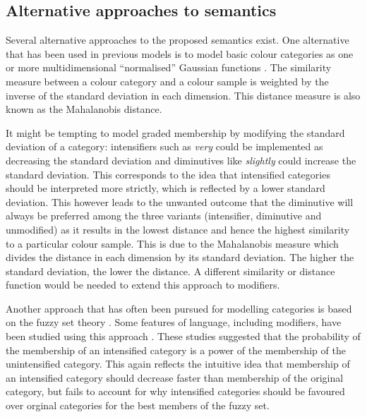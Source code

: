 
\subsection{Alternative approaches to semantics}

Several alternative approaches to the proposed semantics exist. One
alternative that has been used in previous models is to model basic
colour categories as one or more multidimensional ``normalised''
Gaussian functions \citep{lammens94computational,
  steels05coordinating}. The similarity measure between a colour
category and a colour sample is weighted by the inverse of the
standard deviation in each dimension. This distance measure is also
known as the Mahalanobis distance.

It might be tempting to model graded membership by modifying the
standard deviation of a category: intensifiers such as \textit{very} could
be implemented as decreasing the standard deviation and diminutives
like \textit{slightly} could increase the standard deviation. This
corresponds to the idea that intensified categories should be
interpreted more strictly, which is reflected by a lower standard
deviation. This however leads to the unwanted outcome that the
diminutive will always be preferred among the three variants
(intensifier, diminutive and unmodified) as it results in the lowest
distance and hence the highest similarity to a particular colour
sample. This is due to the Mahalanobis measure which divides the
distance in each dimension by its standard deviation. The higher the
standard deviation, the lower the distance. A different similarity or
distance function would be needed to extend this approach to
modifiers.

Another approach that has often been pursued for modelling categories
is based on the fuzzy set theory \citep{kay78linguistic,
  benavente08parametric}. Some features of language, including
modifiers, have been studied using this approach
\citep{hersh76fuzzy}. These studies suggested that the probability of
the membership of an intensified category is a power of the membership
of the unintensified category. This again reflects the intuitive idea
that membership of an intensified category should decrease faster than
membership of the original category, but fails to account for why
intensified categories should be favoured over orginal categories for
the best members of the fuzzy set.

